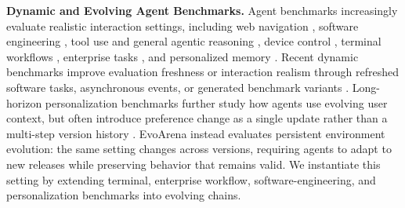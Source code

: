 \documentclass{article}
\begin{document}
\textbf{Dynamic and Evolving Agent Benchmarks.} \quad
Agent benchmarks increasingly evaluate realistic interaction settings, including web navigation \cite{zhou2023webarena}, software engineering \cite{jimenez2024swebench}, tool use and general agentic reasoning \cite{liu2024agentbench,mialon2024gaia}, device control \cite{rawles2025androidworld}, terminal workflows \cite{terminal-bench}, enterprise tasks \cite{workarena++}, and personalized memory \cite{jiang2025personamem}. Recent dynamic benchmarks improve evaluation freshness or interaction realism through refreshed software tasks, asynchronous events, or generated benchmark variants \cite{gaia2,li2026swe-benchl-ive,benchmark-selfevolv}. Long-horizon personalization benchmarks further study how agents use evolving user context, but often introduce preference change as a single update rather than a multi-step version history \cite{li2026horizonbench}. EvoArena instead evaluates persistent environment evolution: the same setting changes across versions, requiring agents to adapt to new releases while preserving behavior that remains valid. We instantiate this setting by extending terminal, enterprise workflow, software-engineering, and personalization benchmarks into evolving chains.
\end{document}
